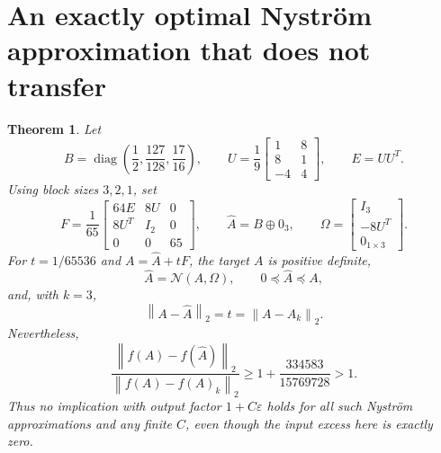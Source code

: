 \documentclass[11pt]{article}
\newtheorem{theorem}{Theorem}[section]
\theoremstyle{definition}
\newcommand{\diag}{\operatorname{diag}}
\newcommand{\norm}[1]{\left\lVert#1\right\rVert}
\newcommand{\eps}{\varepsilon}
\begin{document}
\section{An exactly optimal Nystr\"om approximation that does not transfer}
\begin{theorem}\label{thm:spectral}
Let
\[
 B=\diag\left(\frac12,\frac{127}{128},\frac{17}{16}\right),\qquad
 U=\frac19\begin{bmatrix}1&8\\8&1\\-4&4\end{bmatrix},\qquad E=UU^T.
\]
Using block sizes $3,2,1$, set
\[
 F=\frac1{65}\begin{bmatrix}
 64E&8U&0\\8U^T&I_2&0\\0&0&65
 \end{bmatrix},\qquad
 \widehat A=B\oplus0_3,\qquad
 \Omega=\begin{bmatrix}I_3\\-8U^T\\0_{1\times3}\end{bmatrix}.
\]
For $t=1/65536$ and $A=\widehat A+tF$, the target $A$ is positive definite,
\[
 \widehat A=\mathcal N(A,\Omega),\qquad
 0\preceq\widehat A\preceq A,
\]
and, with $k=3$,
\[
 \norm{A-\widehat A}_2=t=\norm{A-A_k}_2.
\]
Nevertheless,
\begin{equation}\label{eq:spectralratio}
 \frac{\norm{f(A)-f(\widehat A)}_2}
      {\norm{f(A)-f(A)_k}_2}
 \ge1+\frac{334583}{15769728}>1.
\end{equation}
Thus no implication with output factor $1+C\eps$ holds for all such Nystr\"om approximations and any finite $C$, even though the input excess here is exactly zero.
\end{theorem}
\end{document}
